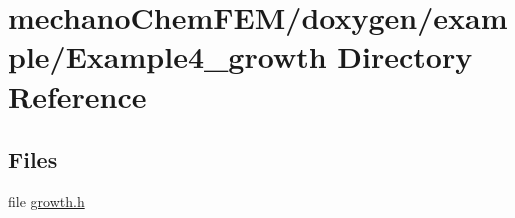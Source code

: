 \section{mechano\-Chem\-F\-E\-M/doxygen/example/\-Example4\-\_\-growth Directory Reference}
\label{dir_9eb9d4c798ee2b79213838e4b997875b}
\subsection*{Files}
\begin{DoxyCompactItemize}
\item 
file \hyperlink{growth_8h}{growth.\-h}
\end{DoxyCompactItemize}
